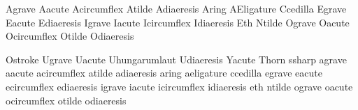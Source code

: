 


\startencoding[uc]

 Agrave        {}
 Aacute        {}
 Acircumflex   {}
 Atilde        {}
 Adiaeresis    {}
 Aring         {}
 AEligature    {}
 Ccedilla      {}
 Egrave        {}
 Eacute        {}
 Ediaeresis    {}
 Igrave        {}
 Iacute        {}
 Icircumflex   {}
 Idiaeresis    {}
 Eth           {}
 Ntilde        {}
 Ograve        {}
 Oacute        {}
 Ocircumflex   {}
 Otilde        {}
 Odiaeresis    {}

 Ostroke       {}
 Ugrave        {}
 Uacute        {}
 Uhungarumlaut {}
 Udiaeresis    {}
 Yacute        {}
 Thorn         {}
 ssharp        {}
 agrave        {}
 aacute        {}
 acircumflex   {}
 atilde        {}
 adiaeresis    {}
 aring         {}
 aeligature    {}
 ccedilla      {}
 egrave        {}
 eacute        {}
 ecircumflex   {}
 ediaeresis    {}
 igrave        {}
 iacute        {}
 icircumflex   {}
 idiaeresis    {}
 eth           {}
 ntilde        {}
 ograve        {}
 oacute        {}
 ocircumflex   {}
 otilde        {}
 odiaeresis    {}

